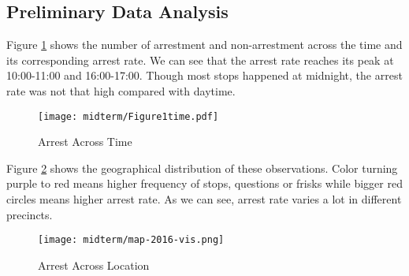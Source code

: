 \documentclass[letterpaper, twocolumn]{article}
\begin{document}

\subsection{Preliminary Data Analysis}

Figure \ref{fig:arstmade} shows the number of arrestment and non-arrestment across the time and its corresponding arrest rate. We can see that the arrest rate reaches its peak at 10:00-11:00 and 16:00-17:00. Though most stops happened at midnight, the arrest rate was not that high compared with daytime.

\begin{figure}[htbp]
    \centering
    \texttt{[image: midterm/Figure1time.pdf]}
    \caption{Arrest Across Time}
    \label{fig:arstmade}
\end{figure}




Figure \ref{fig:location} shows the geographical distribution of these observations. Color turning purple to red means higher frequency of stops, questions or frisks while bigger red circles means higher arrest rate. As we can see, arrest rate varies a lot in different precincts.

\begin{figure}[htbp]
    \centering
    \texttt{[image: midterm/map-2016-vis.png]}
    \caption{Arrest Across Location}
    \label{fig:location}
\end{figure}
\end{document}
